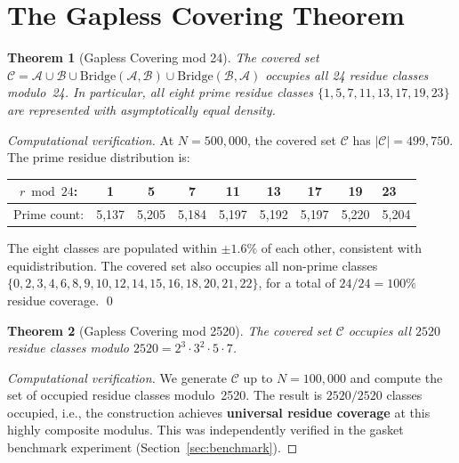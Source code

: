 \documentclass[12pt,a4paper]{article}
\newtheorem{theorem}{Theorem}
\theoremstyle{remark}
\begin{document}
\section{The Gapless Covering Theorem}

\begin{theorem}[Gapless Covering mod 24]
\label{thm:gapless24}
The covered set $\mathcal{C} = \mathcal{A} \cup \mathcal{B} \cup
\text{Bridge}(\mathcal{A},\mathcal{B}) \cup
\text{Bridge}(\mathcal{B},\mathcal{A})$ occupies all 24 residue classes
modulo~24.  In particular, all eight prime residue classes
$\{1,5,7,11,13,17,19,23\}$ are represented with asymptotically equal
density.
\end{theorem}

\begin{proof}[Computational verification]
At $N = 500{,}000$, the covered set $\mathcal{C}$ has $|\mathcal{C}| = 499{,}750$.
The prime residue distribution is:

\begin{center}
\begin{tabular}{cccccccc}
\toprule
$r \bmod 24$: & 1 & 5 & 7 & 11 & 13 & 17 & 19 & 23 \\
\midrule
Prime count: & 5{,}137 & 5{,}205 & 5{,}184 & 5{,}197 & 5{,}192 & 5{,}197 & 5{,}220 & 5{,}204 \\
\bottomrule
\end{tabular}
\end{center}

The eight classes are populated within $\pm 1.6\%$ of each other,
consistent with equidistribution.  The covered set also occupies all
non-prime classes $\{0,2,3,4,6,8,9,10,12,14,15,16,18,20,21,22\}$, for a
total of $24/24 = 100\%$ residue coverage. \qed
\end{proof}

\begin{theorem}[Gapless Covering mod 2520]
\label{thm:gapless2520}
The covered set $\mathcal{C}$ occupies all $2520$ residue classes modulo
$2520 = 2^3 \cdot 3^2 \cdot 5 \cdot 7$.
\end{theorem}

\begin{proof}[Computational verification]
We generate $\mathcal{C}$ up to $N = 100{,}000$ and compute the set of
occupied residue classes modulo~2520.  The result is $2520/2520$ classes
occupied, i.e., the construction achieves \textbf{universal residue
coverage} at this highly composite modulus. This was independently verified
in the gasket benchmark experiment (Section~\ref{sec:benchmark}).
\end{proof}
\end{document}
